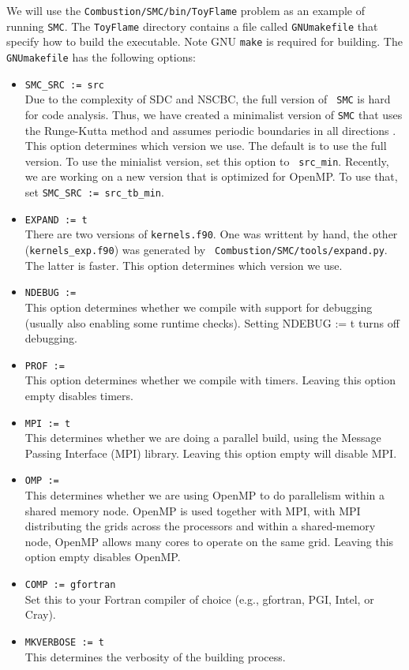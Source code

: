 \documentclass[11pt,letterpaper]{article}
\begin{document}
We will use the {\tt Combustion/SMC/bin/ToyFlame} problem as an
example of running {\tt SMC}.  The {\tt ToyFlame} directory contains
a file called {\tt GNUmakefile} that specify how to build the
executable.  Note GNU {\tt make} is required for building.  The {\tt
  GNUmakefile} has the following options:
\begin{itemize}
\item {\tt SMC\_SRC := src}\\
  Due to the complexity of SDC and NSCBC, the full version of {\tt
    SMC} is hard for code analysis.  Thus, we have created a
  minimalist version of {\tt SMC} that uses the Runge-Kutta method and
  assumes periodic boundaries in all directions .  This option
  determines which version we use.  The default is to use the full
  version.  To use the minialist version, set this option to {\tt
    src\_min}.  Recently, we are working on a new version that is
  optimized for OpenMP.  To use that, set {\tt SMC\_SRC :=
    src\_tb\_min}. 
\item {\tt EXPAND := t}\\
  There are two versions of {\tt kernels.f90}.  One was writtent by
  hand, the other ({\tt kernels\_exp.f90}) was generated by {\tt
    Combustion/SMC/tools/expand.py}.  The latter is faster.  This option
  determines which version we use.
\item {\tt NDEBUG :=}\\
  This option determines whether we compile with support for debugging
  (usually also enabling some runtime checks). Setting NDEBUG := t
  turns off debugging.
\item {\tt PROF :=}\\
  This option determines whether we compile with timers. Leaving this
  option empty disables timers.
\item {\tt MPI := t}\\
  This determines whether we are doing a parallel build, using the
  Message Passing Interface (MPI) library. Leaving this
  option empty will disable MPI.
\item {\tt OMP :=}\\
  This determines whether we are using OpenMP to do parallelism within
  a shared memory node. OpenMP is used together with MPI, with MPI
  distributing the grids across the processors and within a
  shared-memory node, OpenMP allows many cores to operate on the same
  grid.  Leaving this option empty disables OpenMP.
\item {\tt COMP := gfortran}\\
  Set this to your Fortran compiler of choice (e.g., gfortran, PGI,
  Intel, or Cray).
\item {\tt MKVERBOSE := t}\\
  This determines the verbosity of the building process.
\end{itemize}
\end{document}
